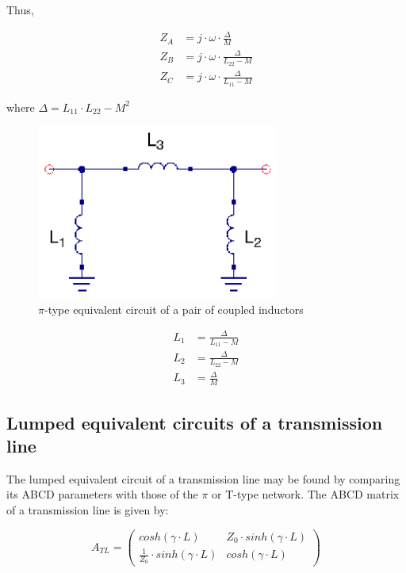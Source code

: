 \noindent Thus,

\begin{align}
   Z_A &= j \cdot \omega \cdot \frac{\Delta}{M} \\
   Z_B &= j \cdot \omega \cdot \frac{\Delta}{L_{22} - M} \\
   Z_C &= j \cdot \omega \cdot \frac{\Delta}{L_{11} - M}
\end{align}

\noindent where $\Delta = L_{11} \cdot L_{22} - M^2$

\begin{figure}[H]
\centering
\includegraphics[width=80mm]{./images/Synthesis/Impedance_Matching/coupled-inductors-pi-equivalent}
\caption{$\pi$-type equivalent circuit of a pair of coupled inductors}
\label{fig:pi-type-coupled-inductor-equivalent}
\end{figure}


\begin{align}
   L_1 &= \frac{\Delta}{L_{11} - M} \\
   L_2 &= \frac{\Delta}{L_{22} - M} \\
   L_3 &= \frac{\Delta}{M}
\end{align}

\subsection{Lumped equivalent circuits of a transmission line}

\noindent The lumped equivalent circuit of a transmission line may be found by comparing its ABCD parameters with those of the $\pi$ or T-type network. The ABCD matrix of a transmission line is given by:

\begin{equation}
A_{TL} = \begin{pmatrix}
    cosh(\gamma \cdot L)       & Z_0 \cdot sinh(\gamma \cdot L) \\
    \frac{1}{Z_0} \cdot sinh(\gamma \cdot L) & cosh(\gamma \cdot L)
\end{pmatrix}
\end{equation}

